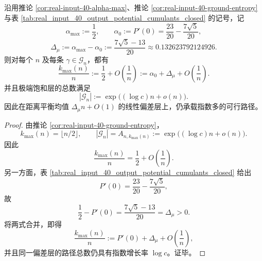 \begin{theorem}[最大密度层与平衡均值之间存在显式代数间隙而仍保留正熵]\label{thm:xi-real-input-ground-layer-mean-gap-positive-entropy}
沿用推论 \ref{cor:real-input-40-alpha-max}、推论 \ref{cor:real-input-40-ground-entropy} 与表 \ref{tab:real_input_40_output_potential_cumulants_closed} 的记号，记
\[
\alpha_{\max}:=\frac12,
\qquad
\alpha_0:=P'(0)=\frac{23}{20}-\frac{7\sqrt5}{20},
\]
\[
\Delta_\mu:=\alpha_{\max}-\alpha_0
:=
\frac{7\sqrt5-13}{20}
\approx 0.132623792124926.
\]
则对每个 \(n\) 及每条 \(\gamma\in\mathcal G_n\)，都有
\[
\frac{k_{\max}(n)}{n}
:=
\frac12+O\!\left(\frac{1}{n}\right)
:=
\alpha_0+\Delta_\mu+O\!\left(\frac{1}{n}\right).
\]
并且极端饱和层的总数满足
\[
|\mathcal G_n|
:=
\exp\bigl((\log c)n+o(n)\bigr).
\]
因此在距离平衡均值 \(\Delta_\mu n+O(1)\) 的线性偏差层上，仍承载指数多的可行路径。
\end{theorem}
\begin{proof}
由推论 \ref{cor:real-input-40-ground-entropy}，
\[
k_{\max}(n)=\lfloor n/2\rfloor,
\qquad
|\mathcal G_n|=A_{n,k_{\max}(n)}
:=
\exp\bigl((\log c)n+o(n)\bigr).
\]
因此
\[
\frac{k_{\max}(n)}{n}=\frac12+O\!\left(\frac{1}{n}\right).
\]
另一方面，表 \ref{tab:real_input_40_output_potential_cumulants_closed} 给出
\[
P'(0)=\frac{23}{20}-\frac{7\sqrt5}{20},
\]
故
\[
\frac12-P'(0)=\frac{7\sqrt5-13}{20}=\Delta_\mu>0.
\]
将两式合并，即得
\[
\frac{k_{\max}(n)}{n}
:=
P'(0)+\Delta_\mu+O\!\left(\frac{1}{n}\right),
\]
并且同一偏差层的路径总数仍具有指数增长率 \(\log c\)。证毕。
\end{proof}
